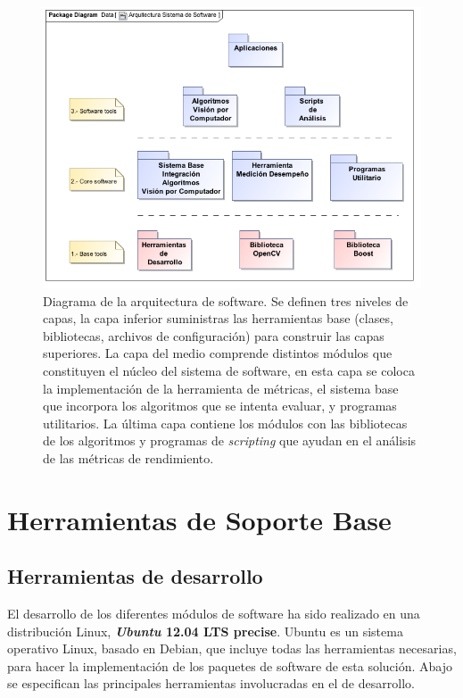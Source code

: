 \begin{figure}[h!]
\centering
\includegraphics[scale=0.7]{img/ch5/BGS_Architecture}
\caption[Arquitectura modular de software]{Diagrama de la arquitectura de software. Se definen tres niveles de capas, la capa inferior suministras las herramientas base (clases, bibliotecas, archivos de configuración) para construir las capas superiores. La capa del medio comprende distintos módulos que constituyen el núcleo del sistema de software, en esta capa se coloca la implementación de la herramienta de métricas, el sistema base que incorpora los algoritmos que se intenta evaluar, y programas utilitarios. La última capa contiene los módulos con las bibliotecas de los algoritmos y programas de \textit{scripting} que ayudan en el análisis de las métricas de rendimiento.}
\label{fig:arq_software}
\end{figure}

\section{Herramientas de Soporte Base}

\subsection{Herramientas de desarrollo}
El desarrollo de los diferentes módulos de software ha sido realizado en una distribución Linux, \textbf{\textit{Ubuntu} 12.04 LTS precise}. Ubuntu es un sistema operativo Linux, basado en Debian, que incluye todas las herramientas necesarias, para hacer la implementación de los paquetes de software de esta solución. Abajo se especifican las principales herramientas involucradas en el de desarrollo.

